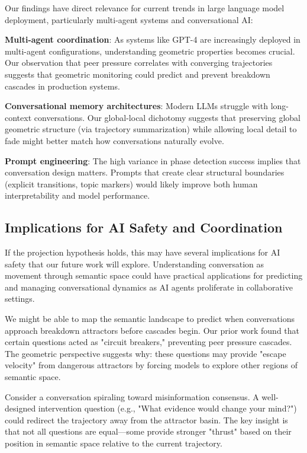 \documentclass[11pt,letterpaper]{article}
\begin{document}
Our findings have direct relevance for current trends in large language model deployment, particularly multi-agent systems and conversational AI:

\textbf{Multi-agent coordination}: As systems like GPT-4 are increasingly deployed in multi-agent configurations, understanding geometric properties becomes crucial. Our observation that peer pressure correlates with converging trajectories suggests that geometric monitoring could predict and prevent breakdown cascades in production systems.

\textbf{Conversational memory architectures}: Modern LLMs struggle with long-context conversations. Our global-local dichotomy suggests that preserving global geometric structure (via trajectory summarization) while allowing local detail to fade might better match how conversations naturally evolve.

\textbf{Prompt engineering}: The high variance in phase detection success implies that conversation design matters. Prompts that create clear structural boundaries (explicit transitions, topic markers) would likely improve both human interpretability and model performance.

\subsection{Implications for AI Safety and Coordination}

If the projection hypothesis holds, this may have several implications for AI safety that our future work will explore. Understanding conversation as movement through semantic space could have practical applications for predicting and managing conversational dynamics as AI agents proliferate in collaborative settings.

We might be able to map the semantic landscape to predict when conversations approach breakdown attractors before cascades begin. Our prior work \citep{garcia2025peer} found that certain questions acted as "circuit breakers," preventing peer pressure cascades. The geometric perspective suggests why: these questions may provide "escape velocity" from dangerous attractors by forcing models to explore other regions of semantic space.

Consider a conversation spiraling toward misinformation consensus. A well-designed intervention question (e.g., "What evidence would change your mind?") could redirect the trajectory away from the attractor basin. The key insight is that not all questions are equal—some provide stronger "thrust" based on their position in semantic space relative to the current trajectory.
\end{document}

